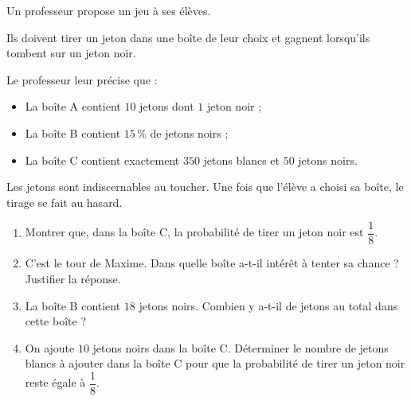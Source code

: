 
\medskip

Un professeur propose un jeu à ses élèves.

Ils doivent tirer un jeton dans une boîte de leur choix et gagnent lorsqu'ils tombent sur un jeton noir. 

Le professeur leur précise que :

\setlength\parindent{1cm}
\begin{itemize}
\item La boîte A contient $10$ jetons dont $1$ jeton noir ;
\item La boîte B contient $15$\,\% de jetons noirs ;
\item La boîte C contient exactement $350$ jetons blancs et $50$ jetons noirs.
\end{itemize}
\setlength\parindent{0cm}

\medskip

Les jetons sont indiscernables au toucher. Une fois que l'élève a choisi sa boîte, le tirage se fait au hasard.

\medskip

\begin{enumerate}
\item Montrer que, dans la boîte C, la probabilité de tirer un jeton noir est $\dfrac{1}{8}$.
\item C'est le tour de Maxime. Dans quelle boîte a-t-il intérêt à tenter sa chance ? Justifier la réponse.
\item La boîte B contient $18$ jetons noirs. Combien y a-t-il de jetons au total dans cette boîte  ? \item  On ajoute $10$ jetons noirs dans la boîte C. Déterminer le nombre de jetons blancs à ajouter dans la boîte C pour que la probabilité de tirer un jeton noir reste égale à $\dfrac{1}{8}$.
\end{enumerate}

\bigskip


